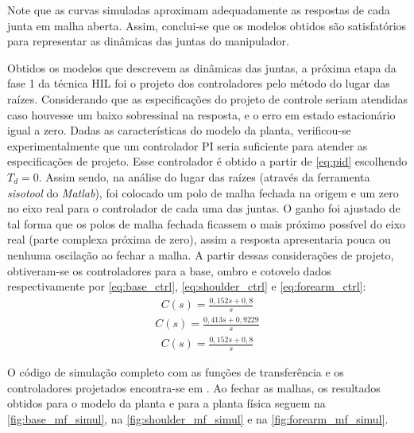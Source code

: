Note que as curvas simuladas aproximam adequadamente as respostas de cada junta em malha aberta. Assim, 
conclui-se que os modelos obtidos são satisfatórios para representar as dinâmicas das juntas do manipulador.

Obtidos os modelos que descrevem as dinâmicas das juntas, a próxima etapa da fase 1 da técnica HIL foi o projeto dos 
controladores pelo método do lugar das raízes. Considerando que as especificações do projeto
de controle seriam atendidas caso houvesse um baixo sobressinal na resposta, e o erro em estado
estacionário igual a
zero. Dadas as características do modelo da planta, verificou-se experimentalmente que um controlador
PI seria suficiente para atender as especificações de projeto. Esse controlador é obtido a partir
de \eqref{eq:pid} escolhendo $T_d=0$.
Assim sendo, na análise do lugar das raízes (através da ferramenta \textit{sisotool} do \textit{Matlab}), foi colocado um polo de malha
fechada na origem e um zero no eixo real para o controlador de cada uma das juntas. O ganho foi 
ajustado de tal forma que os polos de malha fechada ficassem o mais próximo possível do eixo real (parte complexa próxima de zero), 
assim a resposta apresentaria pouca ou nenhuma oscilação ao fechar a malha. A partir dessas considerações de projeto, 
obtiveram-se os controladores para a base, ombro e cotovelo dados respectivamente por \eqref{eq:base_ctrl}, \eqref{eq:shoulder_ctrl}
e \eqref{eq:forearm_ctrl}:
\begin{equation}
  \begin{gathered}
    C(s) = \frac{0,152s + 0,8}{s}
  \end{gathered}
  \label{eq:base_ctrl}
\end{equation}
\begin{equation}
  \begin{gathered}
    C(s) = \frac{0,413 s + 0,9229}{s}
  \end{gathered}
  \label{eq:shoulder_ctrl}
\end{equation}
\begin{equation}
  \begin{gathered}
   C(s) = \frac{0,152s + 0,8}{s}
  \end{gathered}
  \label{eq:forearm_ctrl}
\end{equation}

O código de simulação completo com as funções de transferência e os controladores projetados encontra-se em \cite{lelis_hil1}.
Ao fechar as malhas, os resultados obtidos para o modelo da planta e para a planta física seguem na 
\autoref{fig:base_mf_simul}, na \autoref{fig:shoulder_mf_simul} e na \autoref{fig:forearm_mf_simul}.

